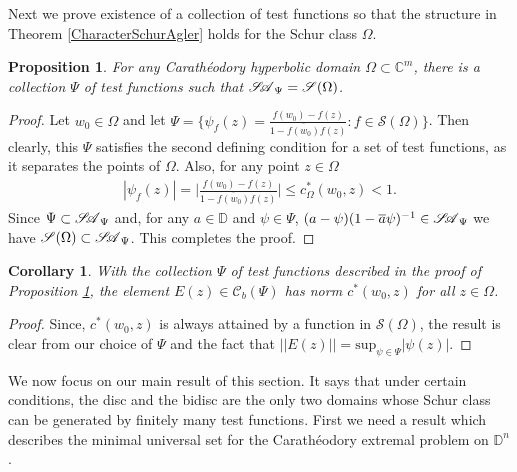 \documentclass[12pt]{amsart}
\newtheorem{corollary}[theorem]{Corollary}
\newtheorem{proposition}[theorem]{Proposition}
\theoremstyle{definition}
\numberwithin{equation}{section}
\newcommand{\D}{\mathbb{D}}
\newcommand{\SA}{\mathscr{S\mspace{-5mu}A}}
\newcommand{\CB}{\mathcal{C}_b(\Psi)}
\begin{document}
Next we prove existence of a collection of test functions so that the structure in Theorem \ref{CharacterSchurAgler} holds for the Schur class $\mathscr{\Omega}$.

\begin{proposition}\label{UniversalTestFunctions}
	For any Carath\'eodory hyperbolic domain $\Omega\subset\mathbb{C}^m$, there is a collection $\Psi$ of test functions such that $\SA_\Psi=\mathscr{S}(\Omega)$.
\end{proposition}


\begin{proof}
	Let $w_0\in \Omega$ and let $\Psi =\{\psi_f (z)=\frac{f(w_0)-f(z)}{1-\overline{f(w_0)}f(z)}:f \in \mathscr{S} (\Omega)\}$. Then clearly, this $\Psi$ satisfies the second defining condition for a set of test functions, as it separates the points of $\Omega$. Also, for any point $z\in \Omega$
	\begin{align*}
		|\psi_f(z)|=\bigg|\frac{f (w_0)-f (z)}{1- \overline{f(w_0)}f(z)}\bigg|\leq c^* _\Omega  (w_0 , z)<1.
	\end{align*}
	Since $\Psi\subset\SA_\Psi$ and, for any  $a\in \mathbb{D}$ and $\psi \in \Psi$, $(a-\psi)(1-\overline{a}\psi)^{-1}\in \SA_\Psi$ we have $\mathscr{S}(\Omega)\subset\SA_\Psi$. This completes the proof.
\end{proof}
\begin{corollary}
	With the collection $\Psi$ of test functions described in the proof of Proposition \ref{UniversalTestFunctions}, the element $E(z)\in \CB$ has norm $c^*(w_0,z)$ for all $z\in \Omega$.
\end{corollary}
\begin{proof}
	Since, $c^*(w_0,z)$ is always attained by a function in $\mathscr{S}(\Omega)$, the result is clear from our choice of $\Psi$ and the fact that $||E(z)||=\text{sup}_{\psi\in \Psi} |\psi(z)|$.
\end{proof}
We now focus on our main result of this section. It says that under certain conditions, the disc and the bidisc are the only two domains whose Schur class can be generated by finitely many test functions. First we need a result which describes the minimal universal set for the Carath\'eodory extremal problem on $\D^n$.
\end{document}
